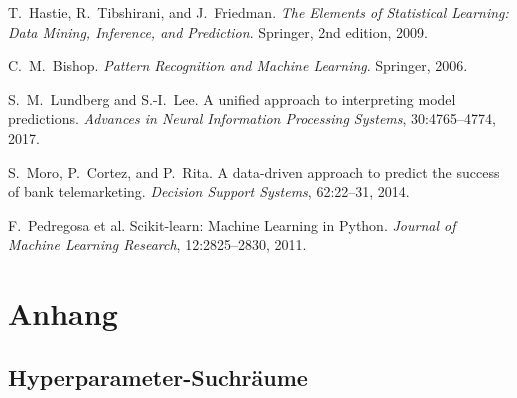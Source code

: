 \documentclass[10pt]{scrartcl}
\begin{document}
\begin{thebibliography}{}
T.~Hastie, R.~Tibshirani, and J.~Friedman.
\newblock \emph{The Elements of Statistical Learning: Data Mining, Inference, and Prediction}.
\newblock Springer, 2nd edition, 2009.

C.~M.~Bishop.
\newblock \emph{Pattern Recognition and Machine Learning}.
\newblock Springer, 2006.

S.~M.~Lundberg and S.-I.~Lee.
\newblock A unified approach to interpreting model predictions.
\newblock \emph{Advances in Neural Information Processing Systems}, 30:4765--4774, 2017.

S.~Moro, P.~Cortez, and P.~Rita.
\newblock A data-driven approach to predict the success of bank telemarketing.
\newblock \emph{Decision Support Systems}, 62:22--31, 2014.

F.~Pedregosa et al.
\newblock Scikit-learn: Machine Learning in Python.
\newblock \emph{Journal of Machine Learning Research}, 12:2825--2830, 2011.

\end{thebibliography}

\appendix
\section{Anhang}

\subsection{Hyperparameter-Suchräume}
\end{document}
